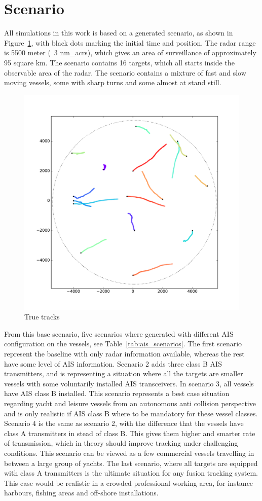 \section{Scenario}\label{sec:scenario}
All simulations in this work is based on a generated scenario, as shown in Figure~\ref{fig:test_scenario}, with black dots marking the initial time and position. The radar range is 5500 meter (~3 \glspl{nm_acr}), which gives an area of surveillance of approximately 95 square km. The scenario contains 16 targets, which all starts inside the observable area of the radar. The scenario contains a mixture of fast and slow moving vessels, some with sharp turns and some almost at stand still. 
\begin{figure}[H]
\centering
\includegraphics[width = .8\textwidth]{Figures/scenarioTruth.pdf}
\caption{True tracks}\label{fig:test_scenario}
\end{figure}
From this base scenario, five scenarios where generated with different AIS configuration on the vessels, see Table~\ref{tab:ais_scenarios}. The first scenario represent the baseline with only radar information available, whereas the rest have some level of AIS information. Scenario 2 adds three class B AIS transmitters, and is representing a situation where all the targets are smaller vessels with some voluntarily installed AIS transceivers. In scenario 3, all vessels have AIS class B installed. This scenario represents a best case situation regarding yacht and leisure vessels from an autonomous anti collision perspective and is only realistic if AIS class B where to be mandatory for these vessel classes. Scenario 4 is the same as scenario 2, with the difference that the vessels have class A transmitters in stead of class B. This gives them higher and smarter rate of transmission, which in theory should improve tracking under challenging conditions. This scenario can be viewed as a few commercial vessels travelling in between a large group of yachts. The last scenario, where all targets are equipped with class A transmitters is the ultimate situation for any fusion tracking system. This case would be realistic in a crowded professional working area, for instance harbours, fishing areas and off-shore installations. 
